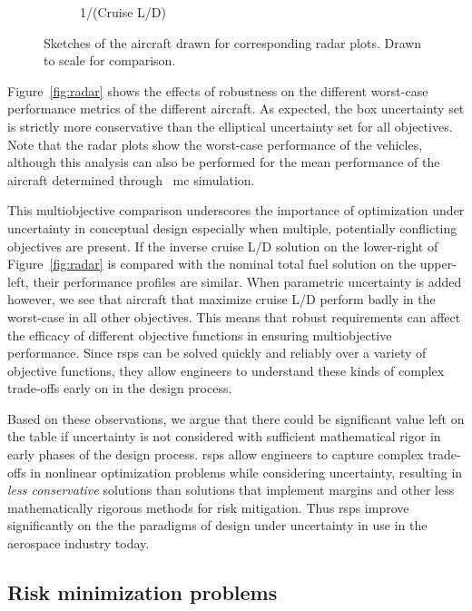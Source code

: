 \begin{figure}
\begin{center}
\begin{subfigure}{0.4\linewidth}
{\begin{tikzpicture}
            \end{tikzpicture}}
            \caption{1/(Cruise L/D)}
        \end{subfigure}
        \caption{Sketches of the aircraft drawn for corresponding radar plots. Drawn to scale for comparison.}
    \end{center}
\end{figure}

Figure~\ref{fig:radar} shows the effects of robustness on
the different worst-case performance metrics of the different aircraft.
As expected, the box uncertainty set is strictly more conservative than the elliptical uncertainty set for
all objectives. Note that the radar plots show the worst-case performance of the vehicles, although
this analysis can also be performed for the mean performance
of the aircraft determined through ~\gls{mc} simulation.

This multiobjective comparison underscores the importance of optimization under uncertainty
in conceptual design especially when multiple, potentially conflicting objectives are present.
If the inverse cruise L/D solution
on the lower-right of Figure~\ref{fig:radar} is compared with the nominal total fuel solution on the upper-left, their
performance profiles are similar. When parametric uncertainty is added however, we see that aircraft
that maximize cruise L/D perform badly in the worst-case
in all other objectives. This means that robust requirements can
affect the efficacy of different objective functions in ensuring multiobjective performance.
Since \gls{rsp}s can be solved quickly and reliably over a variety of objective functions,
they allow engineers to understand these kinds of complex trade-offs early on in the design process.

Based on these observations, we argue that there could be significant value left on the table
if uncertainty is not considered with sufficient mathematical rigor in early phases of
the design process. \gls{rsp}s allow engineers to capture complex
trade-offs in nonlinear optimization problems while considering uncertainty,
resulting in \emph{less conservative} solutions
than solutions that implement margins and other less mathematically
rigorous methods for risk mitigation.
Thus \gls{rsp}s improve significantly on the
the paradigms of design under uncertainty in use
in the aerospace industry today.

\subsection{Risk minimization problems}

